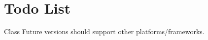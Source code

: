 \chapter{Todo List}
\hypertarget{todo}{}\label{todo}

\begin{DoxyRefList}
\item[Class \doxylink{classSDCard}{SDCard} ]\label{todo__todo000001}%
%
Future versions should support other platforms/frameworks. 
\end{DoxyRefList}